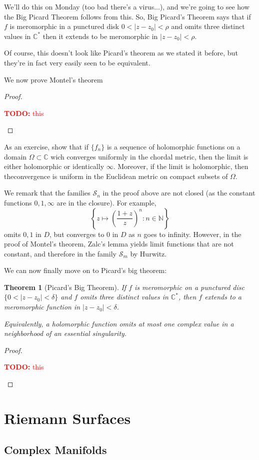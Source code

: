 \documentclass{article}
\newtheorem{theorem}{Theorem}
\newcommand{\mbb}[1]{\mathbb{#1}}
\newcommand{\mc}[1]{\mathcal{#1}}
\newcommand{\TODO}[1]{\begin{center}\huge{\textcolor{red}{\textbf{TODO:} #1}}\end{center}}
\begin{document}
We'll do this on Monday (too bad there's a virus...), and we're going to see how the Big Picard Theorem follows from this. So, Big Picard's Theorem says that if \(f\) is meromorphic in a punctured disk \(0 < |z - z_0| < \rho\) and omits three distinct values in \(\mbb{C}^*\) then it extends to be meromorphic in \(|z - z_0| < \rho\).

Of course, this doesn't look like Picard's theorem as we stated it before, but they're in fact very easily seen to be equivalent.

We now prove Montel's theorem
\begin{proof}
\TODO{this}
\end{proof}

As an exercise, show that if \(\{f_n\}\) is a sequence of holomorphic functions on a domain \(\Omega \subset \mbb{C}\) wich converges uniformly in the chordal metric, then the limit is either holomorphic or identically \(\infty\). Moreover, if the limit is holomorphic, then theconvergence is uniform in the Euclidean metric on compact subsets of \(\Omega\).

We remark that the families \(\mc{S}_n\) in the proof above are not closed (as the constant functions \(0, 1, \infty\) are in the closure). For example,
\[\left\{z \mapsto \left(\frac{1 + z}{z}\right)^n : n \in \mbb{N}\right\}\]
omits \(0, 1\) in \(D\), but converges to \(0\) in \(D\) as \(n\) goes to infinity. However, in the proof of Montel's theorem, Zalc's lemma yields limit functions that are not constant, and therefore in the family \(\mc{S}_m\) by Hurwitz.

We can now finally move on to Picard's big theorem:
\begin{theorem}[Picard's Big Theorem]
If \(f\) is meromorphic on a punctured disc \(\{0 < |z - z_0| < \delta\}\) and \(f\) omits three distinct values in \(\mbb{C}^*\), then \(f\) extends to a meromorphic function in \(|z - z_0| < \delta\).

Equivalently, a holomorphic function omits at most one complex value in a neighborhood of an essential singularity.
\end{theorem}
\begin{proof}
\TODO{this}
\end{proof}

\section{Riemann Surfaces}

\subsection{Complex Manifolds}
\end{document}

